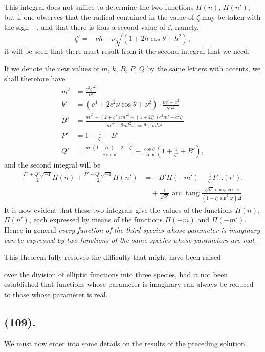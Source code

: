 \documentclass{article}
\begin{document}
This integral does not suffice to determine the two functions $\Pi(n)$, $\Pi(n')$; but if one observes that the radical contained in the value of $\zeta$ may be taken with the sign $-$, and that there is thus a second value of $\zeta$, namely,
\[ \zeta'=-\nu h-\nu\sqrt{(1+2h\cos\theta+h^{2})}, \]
it will be seen that there must result from it the second integral that we need.

If we denote the new values of $m$, $k$, $B$, $P$, $Q$ by the same letters with accents, we shall therefore have
\[ \begin{aligned} m'&=\frac{c^{2}\zeta'^{2}}{\nu^{2}}\\ k'&=(c^{4}+2c^{2}\nu\cos\theta+\nu^{2})\cdot\frac{m'-c^{2}}{b^{2}c^{2}}\\ B'&=\frac{m'^{3}-(2+\zeta')m'^{2}+(1+2\zeta')c^{2}m'-c^{2}\zeta'}{m'^{3}+2m'^{2}\nu\cos\theta+m'\nu^{2}}\\ P'&=1-\frac{1}{\zeta'}-B'\\ Q'&=\frac{m'(1-B')-2-\zeta'}{\nu\sin\theta}-\frac{\cos\theta}{\sin\theta}\left(1+\frac{1}{\zeta'}+B'\right), \end{aligned} \]
and the second integral will be
\[ \begin{aligned} \frac{P'+Q'\sqrt{-1}}{2}\Pi(n)+\frac{P'-Q'\sqrt{-1}}{2}\Pi(n')&=-B'\Pi(-m')-\frac{1}{\zeta'}F\ldots(r').\\ &\quad+\frac{1}{\sqrt{k'}}\operatorname{arc}\operatorname{tang}\frac{\sqrt{k'}\sin\varphi\cos\varphi}{(1+\zeta'\sin^{2}\varphi)\Delta} \end{aligned} \]
It is now evident that these two integrals give the values of the functions $\Pi(n)$, $\Pi(n')$, each expressed by means of the functions $\Pi(-m)$ and $\Pi(-m')$. Hence in general \emph{every function of the third species whose parameter is imaginary can be expressed by two functions of the same species whose parameters are real.}

This theorem fully resolves the difficulty that might have been raised

over the division of elliptic functions into three species, had it not been established that functions whose parameter is imaginary can always be reduced to those whose parameter is real.

\subsection*{(109).}

We must now enter into some details on the results of the preceding solution.
\end{document}
